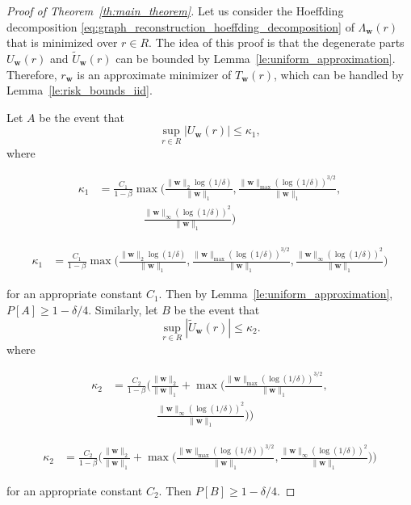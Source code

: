 \documentclass[letterpaper]{article} %
\def\DoubleColumn{}
\def\DoubleColumnEnd{}
\def\SingleColumn{}
\def\SingleColumnEnd{}
\newcommand{\Pro}{P}
\newcommand{\weight}{\mathbf{w}}
\newcommand{\normo}[1]{\|#1\|_1}
\newcommand{\complexbound}{\beta}
\newcommand{\red}[1]{\textcolor{red}{#1}}
\newcommand{\todo}[1]{\red{\textsc{todo:} #1}}
\begin{document}
\begin{proof}[Proof of Theorem~\ref{th:main_theorem}]
    Let us consider the Hoeffding decomposition \eqref{eq:graph_reconstruction_hoeffding_decomposition} of $\Lambda_\weight{}(r)$ that is minimized over $r\in R$. The idea of this proof is that the degenerate parts $U_\weight{}(r)$ and $\widetilde{U}_\weight{}(r)$ can be bounded by Lemma~\ref{le:uniform_approximation}. Therefore, $r_\weight{}$ is an approximate minimizer of $T_\weight{}(r)$, which can be handled by Lemma~\ref{le:risk_bounds_iid}.

    Let $A$ be the event that
    \[\sup_{r\in R}|U_\weight{}(r)|\le \kappa_1,\]
    where
    \DoubleColumn
    \begin{align*}
    \kappa_1&=\frac{C_1}{1-\complexbound{}}\max\Big(\frac{\|\weight{}\|_2\log(1/\delta)}{\normo{\weight{}}},\frac{\|\weight{}\|_{\max}(\log(1/\delta))^{3/2}}{\normo{\weight{}}},\\
    &\qquad\qquad \frac{\|\weight{}\|_\infty(\log(1/\delta))^2}{\normo{\weight{}}}\Big)
    \end{align*}
    \DoubleColumnEnd
    \SingleColumn
    \begin{align*}
    \kappa_1&=\frac{C_1}{1-\complexbound{}}\max\Big(\frac{\|\weight{}\|_2\log(1/\delta)}{\normo{\weight{}}},\frac{\|\weight{}\|_{\max}(\log(1/\delta))^{3/2}}{\normo{\weight{}}}, \frac{\|\weight{}\|_\infty(\log(1/\delta))^2}{\normo{\weight{}}}\Big)
    \end{align*}
    \SingleColumnEnd
    for an appropriate constant $C_1$. Then by Lemma~\ref{le:uniform_approximation}, $\Pro[A]\ge 1-\delta/4$. Similarly, let $B$ be the event that
    \[\sup_{r\in R}|\widetilde{U}_\weight{}(r)|\le \kappa_2.\]
    where
    \DoubleColumn
    \begin{align*}
    \kappa_2&=\frac{C_2}{1-\complexbound{}}\bigg(\frac{\|\weight{}\|_2}{\normo{\weight{}}}+\max\Big(\frac{\|\weight{}\|_{\max}(\log(1/\delta))^{3/2}}{\normo{\weight{}}},\\
    &\qquad\qquad\frac{\|\weight{}\|_\infty(\log(1/\delta))^2}{\normo{\weight{}}}\Big)\bigg)
    \end{align*}
    \DoubleColumnEnd
    \SingleColumn
    \begin{align*}
    \kappa_2&=\frac{C_2}{1-\complexbound{}}\bigg(\frac{\|\weight{}\|_2}{\normo{\weight{}}}+\max\Big(\frac{\|\weight{}\|_{\max}(\log(1/\delta))^{3/2}}{\normo{\weight{}}},\frac{\|\weight{}\|_\infty(\log(1/\delta))^2}{\normo{\weight{}}}\Big)\bigg)
    \end{align*}
    \SingleColumnEnd
    for an appropriate constant $C_2$.
    Then $\Pro[B]\ge 1-\delta/4$.


\end{proof}
\end{document}
